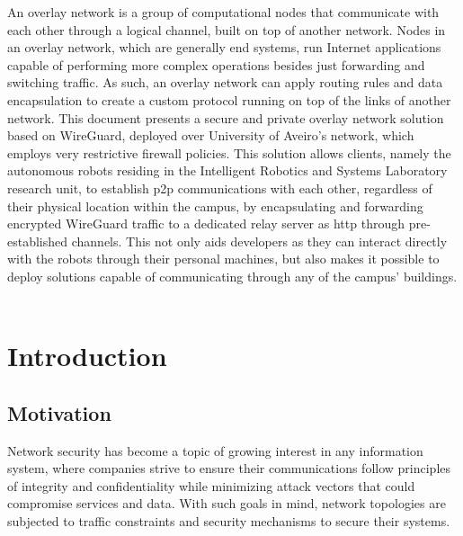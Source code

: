 \documentclass[11pt,twoside,a4paper]{report}
\begin{document}
\TitlePage
  \vspace*{55mm}
       {An overlay network is a group of computational nodes that communicate with each other through a logical channel, built on top of another network. Nodes in an overlay network, which are generally end systems, run Internet applications capable of performing more complex operations besides just forwarding and switching traffic. As such, an overlay network can apply routing rules and data encapsulation to create a custom protocol running on top of the links of another network. This document presents a secure and private overlay network solution based on WireGuard, deployed over University of Aveiro's network, which employs very restrictive firewall policies. This solution allows clients, namely the autonomous robots residing in the Intelligent Robotics and Systems Laboratory research unit, to establish \ac{p2p} communications with each other, regardless of their physical location within the campus, by encapsulating and forwarding encrypted WireGuard traffic to a dedicated relay server as \ac{http} through pre-established channels. This not only aids developers as they can interact directly with the robots through their personal machines, but also makes it possible to deploy solutions capable of communicating through any of the campus' buildings.}
\EndTitlePage
\titlepage\ \endtitlepage %


%
%
\tableofcontents

\cleardoublepage
\listoffigures

\cleardoublepage
\listoftables

\cleardoublepage


\cleardoublepage
{}
\chapter{Introduction}

\section{Motivation}

Network security has become a topic of growing interest in any information system, where companies strive to ensure their communications follow principles of integrity and confidentiality while minimizing attack vectors that could compromise services and data. With such goals in mind, network topologies are subjected to traffic constraints and security mechanisms to secure their systems.
\end{document}
